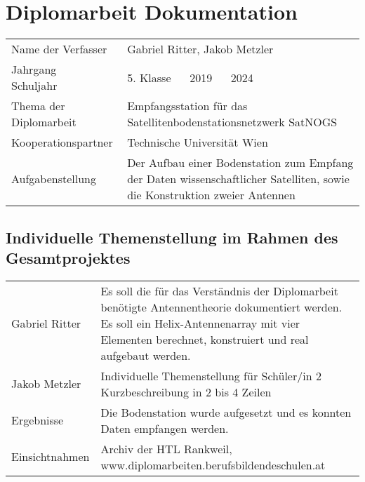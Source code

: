 \section *{Diplomarbeit Dokumentation}


\begin{tabular}{@{}p{5cm}p{8cm}}
	Name der Verfasser & Gabriel Ritter, Jakob Metzler \\
	
	Jahrgang ~\textbar~ Schuljahr & 5. Klasse ~\textbar~ 2019 ~\textbar~ 2024\\
	
	Thema der Diplomarbeit & Empfangsstation für das Satellitenbodenstationsnetzwerk SatNOGS\\
	
	Kooperationspartner & Technische Universität Wien \\
	
	Aufgabenstellung & Der Aufbau einer Bodenstation zum Empfang der Daten wissenschaftlicher Satelliten, sowie die Konstruktion zweier Antennen\\
\end{tabular}

\pagebreak

\subsection *{Individuelle Themenstellung im Rahmen des Gesamtprojektes}
\begin{tabular}{@{}p{5cm}p{8cm}}
	
	Gabriel Ritter & Es soll die für das Verständnis der Diplomarbeit benötigte Antennentheorie dokumentiert werden. Es soll ein Helix-Antennenarray mit vier Elementen berechnet, konstruiert und real aufgebaut werden. \\
	
	Jakob Metzler & Individuelle Themenstellung für Schüler/in 2	
	Kurzbeschreibung in 2 bis 4 Zeilen \\
	
	Ergebnisse & Die Bodenstation wurde aufgesetzt und es konnten Daten empfangen werden.\\
	
	Einsichtnahmen & Archiv der HTL Rankweil, \newline www.diplomarbeiten.berufsbildendeschulen.at \\
\end{tabular}
